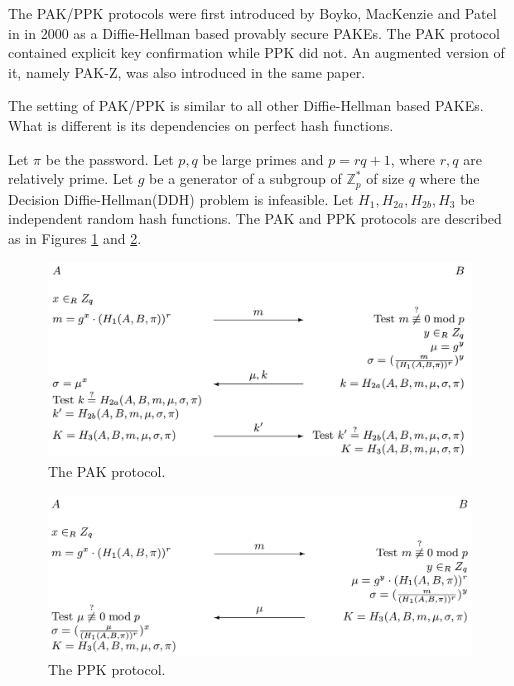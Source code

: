 

The PAK/PPK protocols were first introduced by Boyko, MacKenzie and Patel in \cite{BoMaPa00} in 2000
as a Diffie-Hellman based provably secure PAKEs. The PAK protocol contained explicit key confirmation
while PPK did not. An augmented version of it, namely PAK-Z, was also introduced in the same paper.

The setting of PAK/PPK is similar to all other Diffie-Hellman based PAKEs. What is different is its dependencies on perfect hash functions.

Let $\pi$ be the password. Let $p, q$ be large primes and $p = rq+1$, where $r, q$ are relatively prime. Let $g$ be a generator
of a subgroup of $\mathbb{Z}^\ast_p$ of size $q$ where the Decision Diffie-Hellman(DDH) problem
is infeasible. Let $H_1, H_{2a}, H_{2b}, H_3$ be independent random hash functions. The PAK and PPK
protocols are described as in Figures \ref{fig:pak} and \ref{fig:ppk}.

\begin{figure}[h]
    \label{fig:pak}
    \centering
    \includegraphics[scale=0.4]{pak_protocol.png}
    \caption{The PAK protocol.}
\end{figure}

\begin{figure}[h]
    \label{fig:ppk}
    \centering
    \includegraphics[scale=0.35]{ppk_protocol.png}
    \caption{The PPK protocol.}
\end{figure}


